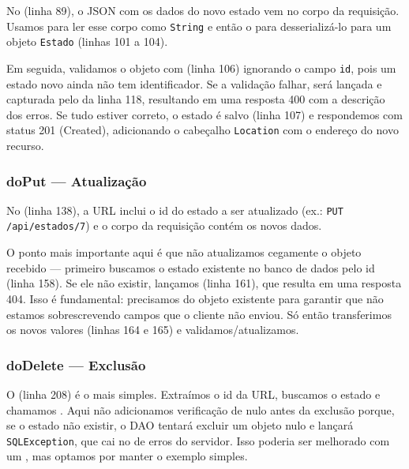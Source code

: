 No  (linha 89), o JSON com os dados do novo estado vem no corpo da requisição. Usamos  para ler esse corpo como \texttt{String} e então o  para desserializá-lo para um objeto \texttt{Estado} (linhas 101 a 104).

Em seguida, validamos o objeto com  (linha 106) ignorando o campo \texttt{id}, pois um estado novo ainda não tem identificador. Se a validação falhar,  será lançada e capturada pelo  da linha 118, resultando em uma resposta 400 com a descrição dos erros. Se tudo estiver correto, o estado é salvo (linha 107) e respondemos com status 201 (Created), adicionando o cabeçalho \texttt{Location} com o endereço do novo recurso.

\subsubsection{doPut --- Atualização}

No  (linha 138), a URL inclui o id do estado a ser atualizado (ex.: \texttt{PUT /api/estados/7}) e o corpo da requisição contém os novos dados.

O ponto mais importante aqui é que não atualizamos cegamente o objeto recebido --- primeiro buscamos o estado existente no banco de dados pelo id (linha 158). Se ele não existir, lançamos  (linha 161), que resulta em uma resposta 404. Isso é fundamental: precisamos do objeto existente para garantir que não estamos sobrescrevendo campos que o cliente não enviou. Só então transferimos os novos valores (linhas 164 e 165) e validamos/atualizamos.

\subsubsection{doDelete --- Exclusão}

O  (linha 208) é o mais simples. Extraímos o id da URL, buscamos o estado e chamamos . Aqui não adicionamos verificação de nulo antes da exclusão porque, se o estado não existir, o DAO tentará excluir um objeto nulo e lançará \texttt{SQLException}, que cai no  de erros do servidor. Isso poderia ser melhorado com um , mas optamos por manter o exemplo simples.


